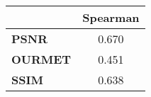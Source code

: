 \begin{tabular}{|l|c|}
\hline
&\textbf{Spearman}\\\hline
\textbf{PSNR}&0.670\\\hline
\textbf{OURMET}&0.451\\\hline
\textbf{SSIM}&0.638\\\hline
\end{tabular}
